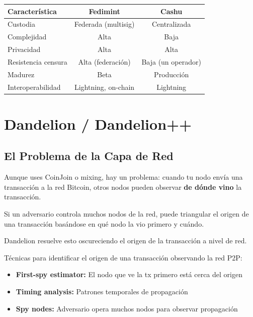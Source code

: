 \documentclass[11pt,a4paper,twoside]{book}
\begin{document}
\begin{center}
\begin{tabular}{lcc}
\toprule
\textbf{Caracter\'istica} & \textbf{Fedimint} & \textbf{Cashu} \\
\midrule
Custodia & Federada (multisig) & Centralizada \\
Complejidad & Alta & Baja \\
Privacidad & Alta & Alta \\
Resistencia censura & Alta (federaci\'on) & Baja (un operador) \\
Madurez & Beta & Producci\'on \\
Interoperabilidad & Lightning, on-chain & Lightning \\
\bottomrule
\end{tabular}
\end{center}

\section{Dandelion / Dandelion++}
\label{sec:dandelion}

\subsection{El Problema de la Capa de Red}

\begin{intuicion}
Aunque uses CoinJoin o mixing, hay un problema: cuando tu nodo env\'ia una transacci\'on a la red Bitcoin, otros nodos pueden observar \textbf{de d\'onde vino} la transacci\'on.

Si un adversario controla muchos nodos de la red, puede triangular el origen de una transacci\'on bas\'andose en qu\'e nodo la vio primero y cu\'ando.

Dandelion resuelve esto oscureciendo el origen de la transacci\'on a nivel de red.
\end{intuicion}

\begin{definition}
T\'ecnicas para identificar el origen de una transacci\'on observando la red P2P:
\begin{itemize}
    \item \textbf{First-spy estimator:} El nodo que ve la tx primero est\'a cerca del origen
    \item \textbf{Timing analysis:} Patrones temporales de propagaci\'on
    \item \textbf{Spy nodes:} Adversario opera muchos nodos para observar propagaci\'on
\end{itemize}
\end{definition}
\end{document}
